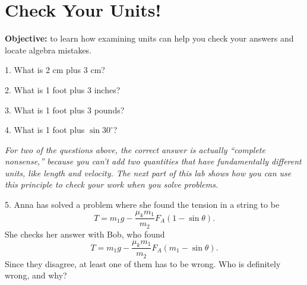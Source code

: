 \section{Check Your Units!}

\makelabheader %


\vspace{0.1in}
\textbf{Objective:} to learn how examining units can help you check your answers and locate algebra mistakes. 
\bigskip

1. What is 2 cm plus 3 cm?
\vspace{0.2in}

2. What is 1 foot plus 3 inches?
\vspace{0.2in}

3. What is 1 foot plus 3 pounds?
\vspace{0.2in}

4. What is 1 foot plus $\sin 30 ^\circ $?
\vspace{0.2in}

\textit{For two of the questions above, the correct answer is actually ``complete nonsense,'' because you can't add two quantities that have fundamentally different units, like length and velocity.  The next part of this lab shows how you can use this principle to check your work when you solve problems.}

5. Anna has solved a problem where she found the tension in a string to be 
$$T = m_1g - \frac{\mu_k m_1}{m_2} F_A (1 - \sin\theta).$$ 
She checks her answer with Bob, who found 
$$T = m_1g - \frac{\mu_k m_1}{m_2} F_A (m_1 - \sin\theta).$$ 
Since they disagree, at least one of them has to be wrong.  Who is definitely wrong, and why?
\vspace{0.7in}

